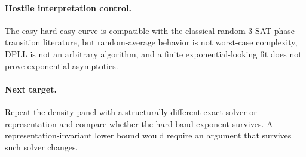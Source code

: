 \paragraph{Hostile interpretation control.}
The easy-hard-easy curve is compatible with the classical random-3-SAT phase-transition
literature, but random-average behavior is not worst-case complexity, DPLL is not an
arbitrary algorithm, and a finite exponential-looking fit does not prove exponential
asymptotics.

\paragraph{Next target.}
Repeat the density panel with a structurally different exact solver or representation
and compare whether the hard-band exponent survives. A representation-invariant lower bound
would require an argument that survives such solver changes.

